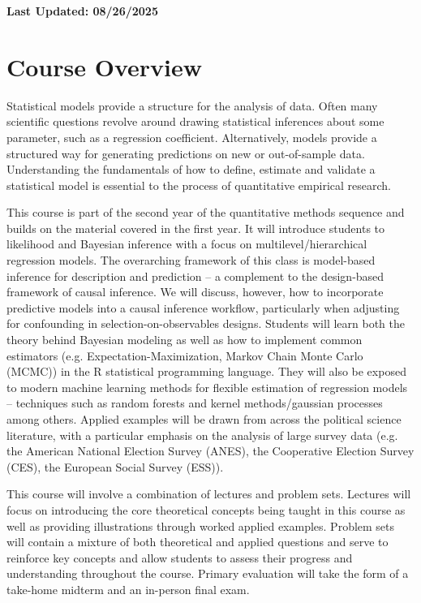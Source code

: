 \documentclass[11pt, article, oneside]{memoir}
\title{{\mytitle}}
\author{\myauthor\smallskip\footnotesize\newline Office: North Hall 322D, 3rd floor
  \newline Office Hours: Drop in or schedule an appointment by e-mail \newline
    \myemail \newline \mywebsite
\newline
}
\date{}
\theoremstyle{Assumption}
\begin{document}
\maketitle
\textbf{Last Updated: 08/26/2025}
\section*{Course Overview}

Statistical models provide a structure for the analysis of data. Often many scientific questions revolve around drawing statistical inferences about some parameter, such as a regression coefficient. Alternatively, models provide a structured way for generating predictions on new or out-of-sample data. Understanding the fundamentals of how to define, estimate and validate a statistical model is essential to the process of quantitative empirical research.

This course is part of the second year of the quantitative methods sequence and builds on the material covered in the first year. It will introduce students to likelihood and Bayesian inference with a focus on multilevel/hierarchical regression models. The overarching framework of this class is model-based inference for description and prediction -- a complement to the design-based framework of causal inference. We will discuss, however, how to incorporate predictive models into a causal inference workflow, particularly when adjusting for confounding in selection-on-observables designs. Students will learn both the theory behind Bayesian modeling as well as how to implement common estimators (e.g. Expectation-Maximization, Markov Chain Monte Carlo (MCMC)) in the R statistical programming language. They will also be exposed to modern machine learning methods for flexible estimation of regression models -- techniques such as random forests and kernel methods/gaussian processes among others. Applied examples will be drawn from across the political science literature, with a particular emphasis on the analysis of large survey data (e.g. the American National Election Survey (ANES), the Cooperative Election Survey (CES), the European Social Survey (ESS)).

This course will involve a combination of lectures and problem sets. Lectures will focus on introducing the core theoretical concepts being taught in this course as well as providing illustrations through worked applied examples. Problem sets will contain a mixture of both theoretical and applied questions and serve to reinforce key concepts and allow students to assess their progress and understanding throughout the course. Primary evaluation will take the form of a take-home midterm and an in-person final exam.
\end{document}
